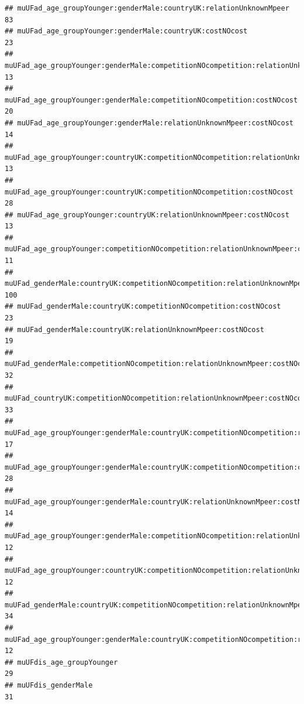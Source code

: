 \documentclass[
]{article}
\begin{document}
\begin{verbatim}
## muUFad_age_groupYounger:genderMale:countryUK:relationUnknownMpeer                                            83
## muUFad_age_groupYounger:genderMale:countryUK:costNOcost                                                      23
## muUFad_age_groupYounger:genderMale:competitionNOcompetition:relationUnknownMpeer                             13
## muUFad_age_groupYounger:genderMale:competitionNOcompetition:costNOcost                                       20
## muUFad_age_groupYounger:genderMale:relationUnknownMpeer:costNOcost                                           14
## muUFad_age_groupYounger:countryUK:competitionNOcompetition:relationUnknownMpeer                              13
## muUFad_age_groupYounger:countryUK:competitionNOcompetition:costNOcost                                        28
## muUFad_age_groupYounger:countryUK:relationUnknownMpeer:costNOcost                                            13
## muUFad_age_groupYounger:competitionNOcompetition:relationUnknownMpeer:costNOcost                             11
## muUFad_genderMale:countryUK:competitionNOcompetition:relationUnknownMpeer                                   100
## muUFad_genderMale:countryUK:competitionNOcompetition:costNOcost                                              23
## muUFad_genderMale:countryUK:relationUnknownMpeer:costNOcost                                                  19
## muUFad_genderMale:competitionNOcompetition:relationUnknownMpeer:costNOcost                                   32
## muUFad_countryUK:competitionNOcompetition:relationUnknownMpeer:costNOcost                                    33
## muUFad_age_groupYounger:genderMale:countryUK:competitionNOcompetition:relationUnknownMpeer                   17
## muUFad_age_groupYounger:genderMale:countryUK:competitionNOcompetition:costNOcost                             28
## muUFad_age_groupYounger:genderMale:countryUK:relationUnknownMpeer:costNOcost                                 14
## muUFad_age_groupYounger:genderMale:competitionNOcompetition:relationUnknownMpeer:costNOcost                  12
## muUFad_age_groupYounger:countryUK:competitionNOcompetition:relationUnknownMpeer:costNOcost                   12
## muUFad_genderMale:countryUK:competitionNOcompetition:relationUnknownMpeer:costNOcost                         34
## muUFad_age_groupYounger:genderMale:countryUK:competitionNOcompetition:relationUnknownMpeer:costNOcost        12
## muUFdis_age_groupYounger                                                                                     29
## muUFdis_genderMale                                                                                           31

\end{verbatim}
\end{document}
